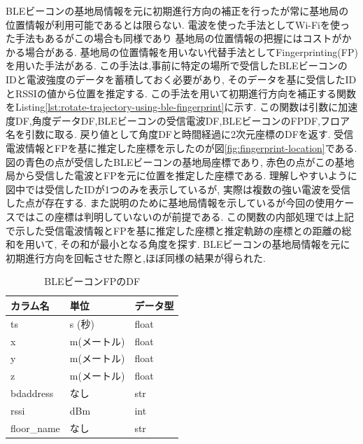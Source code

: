 BLEビーコンの基地局情報を元に初期進行方向の補正を行ったが常に基地局の位置情報が利用可能であるとは限らない.
電波を使った手法としてWi-Fiを使った手法もあるがこの場合も同様であり
基地局の位置情報の把握にはコストがかかる場合がある.
基地局の位置情報を用いない代替手法としてFingerprinting(FP)を用いた手法がある.
この手法は,事前に特定の場所で受信したBLEビーコンのIDと電波強度のデータを蓄積しておく必要があり,
そのデータを基に受信したIDとRSSIの値から位置を推定する.
この手法を用いて初期進行方向を補正する関数をListing\ref{lst:rotate-trajectory-using-ble-fingerprint}に示す.
この関数は引数に加速度DF,角度データDF,BLEビーコンの受信電波DF,BLEビーコンのFPDF,フロア名を引数に取る.
戻り値として角度DFと時間経過に2次元座標のDFを返す.
受信電波情報とFPを基に推定した座標を示したのが図\ref{fig:fingerprint-location}である.
図の青色の点が受信したBLEビーコンの基地局座標であり,
赤色の点がこの基地局から受信した電波とFPを元に位置を推定した座標である.
理解しやすいように図中では受信したIDが1つのみを表示しているが,
実際は複数の強い電波を受信した点が存在する.
また説明のために基地局情報を示しているが今回の使用ケースではこの座標は判明していないのが前提である.
この関数の内部処理では上記で示した受信電波情報とFPを基に推定した座標と推定軌跡の座標との距離の総和を用いて,
その和が最小となる角度を探す.
BLEビーコンの基地局情報を元に初期進行方向を回転させた際と,ほぼ同様の結果が得られた.


\begin{table}[ht]
	\centering
	\begin{tabular}{lll}
		\toprule
		カラム名        & 単位      & データ型  \\
		\midrule
		ts          & s (秒)   & float \\
		x           & m(メートル) & float \\
		y           & m(メートル) & float \\
		z           & m(メートル) & float \\
		bdaddress   & なし      & str   \\
		rssi        & dBm     & int   \\
		floor\_name & なし      & str   \\
		\bottomrule
	\end{tabular}
	\caption{BLEビーコンFPのDF}
	\label{table:ble-beacon-fingerprint-df}
\end{table}


